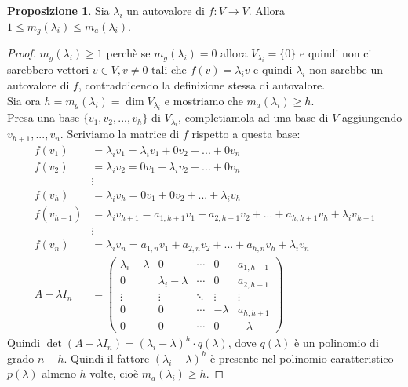 \documentclass[a4paper]{article}
\theoremstyle{definition}
\newtheorem*{prop}{Proposizione}
\begin{document}
	\begin{prop}
		Sia $\lambda_i$ un autovalore di $f: V \to V$. Allora $1 \le m_g(\lambda_i) \le m_a(\lambda_i)$.
	\end{prop}
	\begin{proof}
		$m_g(\lambda_i) \ge 1$ perchè se $m_g(\lambda_i) = 0$ allora $V_{\lambda_i} = \{0\}$
		e quindi non ci sarebbero vettori $v \in V, v \ne 0$ tali che $f(v) = \lambda_i v$ e quindi $\lambda_i$ non sarebbe un autovalore di $f$, contraddicendo la definizione stessa di autovalore. \\
		Sia ora $h = m_g(\lambda_i) = \dim V_{\lambda_i}$ e mostriamo che $m_a(\lambda_i) \ge h$. \\
		Presa una base $\{v_1, v_2, ..., v_h\}$ di $V_{\lambda_i}$, completiamola ad una base di $V$ aggiungendo $v_{h+1}, ..., v_n$.
		Scriviamo la matrice di $f$ rispetto a questa base:
		\begin{align*}
			f(v_1) &= \lambda_i v_1 = \lambda_i v_1 + 0v_2 + ... + 0v_n \\
			f(v_2) &= \lambda_i v_2 = 0v_1 + \lambda_i v_2 + ... + 0v_n \\
			&\vdots \\
			f(v_h) &= \lambda_i v_h = 0v_1 + 0v_2 + ... + \lambda_i v_h \\
			f(v_{h+1}) &= \lambda_i v_{h+1} = a_{1, h+1}v_1 + a_{2, h+1}v_2 + ... + a_{h, h+1}v_h + \lambda_i v_{h+1} \\
			&\vdots \\
			f(v_n) &= \lambda_i v_n = a_{1, n}v_1 + a_{2, n}v_2 + ... + a_{h, n}v_h + \lambda_i v_n \\
			A - \lambda I_n &= \begin{pmatrix}
				\lambda_i - \lambda & 0 & \cdots & 0 & a_{1, h+1} \\
				0 & \lambda_i - \lambda & \cdots & 0 & a_{2, h+1} \\
				\vdots & \vdots & \ddots & \vdots & \vdots \\
				0 & 0 & \cdots & - \lambda & a_{h, h+1} \\
				0 & 0 & \cdots & 0 & - \lambda
			\end{pmatrix}
		\end{align*}
		Quindi $\det(A - \lambda I_n) = (\lambda_i - \lambda)^h \cdot q(\lambda)$, dove $q(\lambda)$ è un polinomio di grado $n - h$.
		Quindi il fattore $(\lambda_i - \lambda)^h$ è presente nel polinomio caratteristico $p(\lambda)$ almeno $h$ volte, cioè $m_a(\lambda_i) \ge h$.
	\end{proof}
\end{document}
